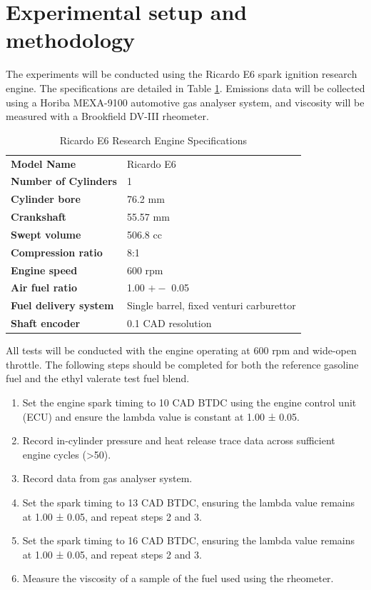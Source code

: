 \documentclass[11pt]{article}
\begin{document}
\section{Experimental setup and methodology}
The experiments will be conducted using the Ricardo E6 spark ignition research engine. The specifications are detailed in Table \ref{intro-1}. Emissions data will be collected using a Horiba MEXA-9100 automotive gas analyser system, and viscosity will be measured with a Brookfield DV-III rheometer.  
\begin{table}[H]
    \begin{center}
    \begin{tabular}{@{}l l@{}}
        \toprule
        \textbf{Model Name} & Ricardo E6 \\ 
        \textbf{Number of Cylinders} & 1 \\
        \textbf{Cylinder bore} & 76.2 mm\\
        \textbf{Crankshaft} & 55.57 mm \\
        \textbf{Swept volume} & 506.8 cc\\
        \textbf{Compression ratio} & 8:1\\
        \textbf{Engine speed} & 600 rpm\\
        \textbf{Air fuel ratio} & 1.00 $+-$ 0.05\\
        \textbf{Fuel delivery system} & Single barrel, fixed venturi carburettor \\
        \textbf{Shaft encoder} & 0.1 CAD resolution\\
        \bottomrule
    \end{tabular}
    \caption{Ricardo E6 Research Engine Specifications}
    \label{intro-1}
\end{center}
\end{table}
All tests will be conducted with the engine operating at 600 rpm and wide-open throttle. The following steps should be completed for both the reference gasoline fuel and the ethyl valerate test fuel blend. 
\begin{enumerate}
	\item Set the engine spark timing to 10 CAD BTDC using the engine control unit (ECU) and ensure the lambda value is constant at 1.00 ± 0.05.
	\item Record in-cylinder pressure and heat release trace data across sufficient engine cycles (>50). 
	\item Record data from gas analyser system. 
	\item Set the spark timing to 13 CAD BTDC, ensuring the lambda value remains at 1.00 ± 0.05, and repeat steps 2 and 3. 
	\item Set the spark timing to 16 CAD BTDC, ensuring the lambda value remains at 1.00 ± 0.05, and repeat steps 2 and 3. 
	\item Measure the viscosity of a sample of the fuel used using the rheometer. 
\end{enumerate}
\end{document}
